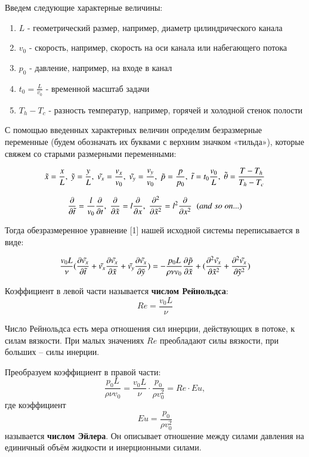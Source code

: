 \bigskip
Введем следующие характерные величины:
\begin{enumerate}
    \item[\textbullet] $L$ - геометрический размер, например, диаметр цилиндрического канала
    \item[\textbullet] $v_0$ - скорость, например, скорость на оси канала или набегающего потока
    \item[\textbullet] $p_0$ - давление, например, на входе в канал
    \item[\textbullet] $t_0 = \frac{L}{v_0}$ - временной масштаб задачи
    \item[\textbullet] $T_h - T_c$ -  разность температур, например, горячей и холодной стенок полости
\end{enumerate}

С помощью введенных характерных величин определим безразмерные переменные (будем обозначать их буквами с верхним значком «тильда»), которые свяжем со старыми размерными переменными:

$$\Tilde{x} = \frac{x}{L},\; \Tilde{y} = \frac{y}{L},\; \Tilde{v_x} = \frac{v_x}{v_0},\; \Tilde{v_y} = \frac{v_y}{v_0},\; \Tilde{p} = \frac{p}{p_0},\; \Tilde{t} = t_0\frac{v_0}{L},\; \Tilde{\theta} = \frac{T - T_h}{T_h - T_c}$$

$$\frac{\partial}{\partial \Tilde{t}} = \frac{l}{v_0} \frac{\partial}{\partial t},\; \frac{\partial}{\partial \Tilde{x}} = l \frac{\partial}{\partial x},\; \frac{\partial^2}{\partial \Tilde{x}^2} = l^2 \frac{\partial}{\partial x^2}\;\; (and\; so\; on...)$$

Тогда обезразмеренное уравнение [1] нашей исходной системы переписывается в виде:

$$\frac{v_0L}{\nu} (\frac{\partial \Tilde{v_x}}{\partial \Tilde{t}} + \Tilde{v_x}\frac{\partial \Tilde{v_x}}{\partial \Tilde{x}} + \Tilde{v_y}\frac{\partial \Tilde{v_x}}{\partial \Tilde{y}}) = -\frac{p_0L}{\rho \nu v_0} \frac{\partial \Tilde{p}}{\partial \Tilde{x}} + (\frac{\partial^2 \Tilde{v_x}}{\partial \Tilde{x}^2} + \frac{\partial^2 \Tilde{v_x}}{\partial \Tilde{y}^2})$$

Коэффициент в левой части называется \textbf{числом Рейнольдса}:
$$Re = \frac{v_0L}{\nu}$$

Число Рейнольдса есть мера отношения сил инерции, действующих в потоке, к силам вязкости. При малых значениях $Re$ преобладают силы вязкости, при больших – силы инерции.

\bigskip
Преобразуем коэффициент в правой части:
$$\frac{p_0L}{\rho \nu v_0} = \frac{v_0L}{\nu} \cdot \frac{p_0}{\rho v_0^2} = Re \cdot Eu,$$
где коэффициент $$Eu = \frac{p_0}{\rho v_0^2}$$
называется \textbf{числом Эйлера}. Он описывает отношение между силами давления на единичный объём жидкости и инерционными силами.

